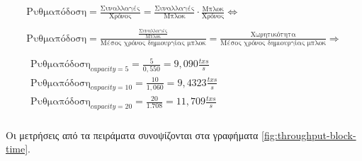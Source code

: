 \documentclass{article}
\begin{document}
\begin{equation}
    \begin{gathered}
        \text{Ρυθμαπόδοση} = \frac{\text{Συναλλαγές}}{\text{Χρόνος}} = \frac{\text{Συναλλαγές}}{\text{Μπλοκ}}\cdot \frac{\text{Μπλοκ}}{\text{Χρόνος}} \Leftrightarrow \\
        \\
        \text{Ρυθμαπόδοση} = \frac{\frac{\text{Συναλλαγές}}{\text{Μπλοκ}} }{\text{Μέσος χρόνος δημιουργίας μπλοκ}} = \frac{\text{Χωρητικότητα}}{\text{Μέσος χρόνος δημιουργίας μπλοκ}} \Rightarrow \\
    \\
    \boxed{
        \begin{gathered}
            \text{Ρυθμαπόδοση}_{capacity=5} = \frac{5}{0,550} = 9,090 \text{} \frac{txs}{s}\\
            \text{Ρυθμαπόδοση}_{capacity=10} = \frac{10}{1,060} = 9,4323 \text{} \frac{txs}{s}\\
            \text{Ρυθμαπόδοση}_{capacity=20} = \frac{20}{1.708} = 11,709 \text{} \frac{txs}{s}\\
        \end{gathered}
    }
    \end{gathered}
\end{equation}

Οι μετρήσεις από τα πειράματα συνοψίζονται στα γραφήματα \ref{fig:throughput-block-time}.

% 
\end{document}
